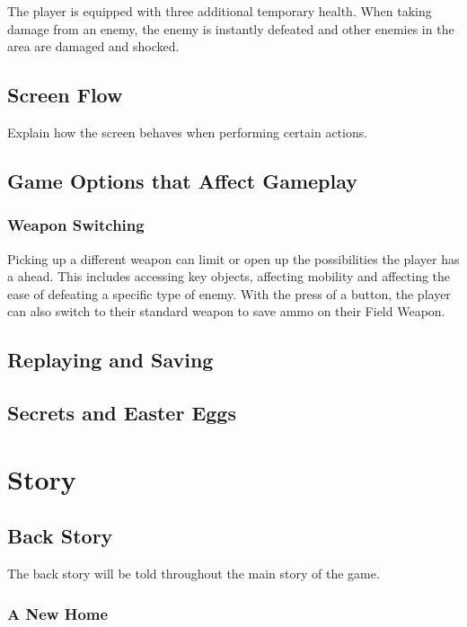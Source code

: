 \documentclass[12pt]{article}
\begin{document}
The player is equipped with three additional temporary health. When taking damage from an enemy, the enemy is instantly defeated and other enemies in the area are damaged and shocked. 

\subsection{Screen Flow}

Explain how the screen behaves when performing certain actions.

\subsection{Game Options that Affect Gameplay}

\subsubsection{Weapon Switching}

Picking up a different weapon can limit or open up the possibilities the player has a ahead. This includes accessing key objects, affecting mobility and affecting the ease of defeating a specific type of enemy. With the press of a button, the player can also switch to their standard weapon to save ammo on their Field Weapon.

\subsection{Replaying and Saving}

\subsection{Secrets and Easter Eggs}

\section{Story}

\subsection{Back Story}

The back story will be told throughout the main story of the game. 

\subsubsection{A New Home}
\end{document}

